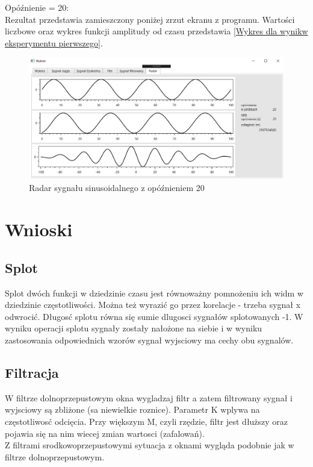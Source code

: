 \documentclass[12pt]{article}
\begin{document}
Opóźnienie = 20:
\\Rezultat przedstawia zamieszczony poniżej zrzut ekranu z programu. Wartości liczbowe oraz wykres funkcji amplitudy od czasu przedstawia \ref{Wykres dla wynikw eksperymentu pierwszego}.
\begin{figure}[h!]
 \centering
 \includegraphics[width=12.3cm]{sin1R20.PNG}
 \vspace{-0.3cm}
 \caption{Radar sygnału sinusoidalnego z opóźnieniem 20}
 \label{r20}
\end{figure}


\section{Wnioski}
\subsection{Splot}
Splot dwóch funkcji w dziedzinie czasu jest równoważny pomnożeniu ich widm w dziedzinie częstotliwości. Można też wyrazić go przez korelacje - trzeba sygnał x odwrocić. Długosć splotu równa się sumie dlugosci sygnałów splotowanych -1.
W wyniku operacji splotu sygnały zostały nałożone na siebie i w wyniku zastosowania odpowiednich wzorów sygnał wyjsciowy ma cechy obu sygnalów.
\subsection{Filtracja}
W filtrze dolnoprzepustowym okna wygladzaj filtr a zatem filtrowany sygnał i wyjsciowy są zbliżone (sa niewielkie roznice).
Parametr K wplywa na częstotliwosć odcięcia. Przy większym M, czyli rzędzie, filtr jest dłuższy oraz pojawia się na nim wiecej zmian wartosci (zafalowań).
\\ Z filtrami srodkowoprzepustowymi sytuacja z oknami wygląda podobnie jak w filtrze dolnoprzepustowym.
\end{document}
